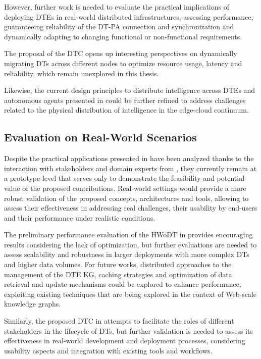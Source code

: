 However, further work is needed to evaluate the practical implications of deploying \acp{DTE} in real-world distributed infrastructures, assessing performance, guaranteeing reliability of the \ac{DT}-\ac{PA} connection and synchronization and dynamically adapting to changing functional or non-functional requirements. 

The proposal of the \ac{DTC} opens up interesting perspectives on dynamically migrating \acp{DT} across different nodes to optimize resource usage, latency and reliability, which remain unexplored in this thesis.

Likewise, the current design principles to distribute intelligence across \acp{DTE} and autonomous agents presented in  could be further refined to address challenges related to the physical distribution of intelligence in the edge-cloud continuum. 


\subsection*{Evaluation on Real-World Scenarios}

Despite the practical applications presented in 
have been analyzed thanks to the interaction with stakeholders and domain experts from \ausl{}, 
they currently remain at a prototype level that serves only to demonstrate the feasibility and potential value of the proposed contributions. 
%
Real-world settings would provide a more robust validation of the proposed concepts, architectures and tools, allowing to assess their effectiveness in addressing real challenges, their usability by end-users and their performance under realistic conditions. 

The preliminary performance evaluation of the \ac{HWoDT} in  provides encouraging results considering the lack of optimization, but further evaluations are needed to assess scalability and robustness in larger deployments with more complex \acp{DT} and higher data volumes.
%
For future works, distributed approaches to the management of the \ac{DTE} \ac{KG}, caching strategies and optimization of data retrieval and update mechanisms could be explored to enhance performance, exploiting existing techniques that are being explored in the context of Web-scale knowledge graphs.

Similarly, the proposed \ac{DTC} in  attempts to facilitate the roles of different stakeholders in the lifecycle of \acp{DT}, but further validation is needed to assess its effectiveness in real-world development and deployment processes, considering usability aspects and integration with existing tools and workflows.


